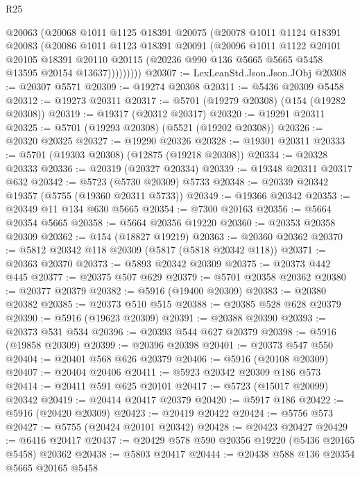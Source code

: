 \begin{lexlean}{R25}
\begin{coremodule}
            @20063
            (@20068
              @1011
              @1125
              @18391
              @20075
              (@20078
                @1011
                @1124
                @18391
                @20083
                (@20086
                  @1011
                  @1123
                  @18391
                  @20091
                  (@20096
                    @1011
                    @1122
                    @20101
                    @20105
                    @18391
                    @20110
                    @20115
                    (@20236 @990 @136 @5665 @5665 @5458 @13595 @20154 @13637)))))))))
@20307 := LexLeanStd.Json.Json.JObj
@20308 := @20307 @5571
@20309 := @19274 @20308
@20311 := @5436 @20309 @5458
@20312 := @19273 @20311
@20317 := @5701 (@19279 @20308) (@154 (@19282 @20308))
@20319 := @19317 (@20312 @20317)
@20320 := @19291 @20311
@20325 := @5701 (@19293 @20308) (@5521 (@19202 @20308))
@20326 := @20320 @20325
@20327 := @19290 @20326
@20328 := @19301 @20311
@20333 := @5701 (@19303 @20308) (@12875 (@19218 @20308))
@20334 := @20328 @20333
@20336 := @20319 (@20327 @20334)
@20339 := @19348 @20311 @20317 @632
@20342 := @5723 (@5730 @20309) @5733
@20348 := @20339 @20342 @19357 (@5755 (@19360 @20311 @5733))
@20349 := @19366 @20342
@20353 := @20349 @11 @134 @630 @5665
@20354 := @7300 @20163
@20356 := @5664 @20354 @5665
@20358 := @5664 @20356 @19220
@20360 := @20353 @20358 @20309
@20362 := @154 (@18827 @19219)
@20363 := @20360 @20362
@20370 := @5812 @20342 @118 @20309 (@5817 (@5818 @20342 @118))
@20371 := @20363 @20370
@20373 := @5893 @20342 @20309
@20375 := @20373 @442 @445
@20377 := @20375 @507 @629
@20379 := @5701 @20358 @20362
@20380 := @20377 @20379
@20382 := @5916 (@19400 @20309)
@20383 := @20380 @20382
@20385 := @20373 @510 @515
@20388 := @20385 @528 @628 @20379
@20390 := @5916 (@19623 @20309)
@20391 := @20388 @20390
@20393 := @20373 @531 @534
@20396 := @20393 @544 @627 @20379
@20398 := @5916 (@19858 @20309)
@20399 := @20396 @20398
@20401 := @20373 @547 @550
@20404 := @20401 @568 @626 @20379
@20406 := @5916 (@20108 @20309)
@20407 := @20404 @20406
@20411 := @5923 @20342 @20309 @186 @573
@20414 := @20411 @591 @625 @20101
@20417 := @5723 (@15017 @20099) @20342
@20419 := @20414 @20417 @20379
@20420 := @5917 @186
@20422 := @5916 (@20420 @20309)
@20423 := @20419 @20422
@20424 := @5756 @573
@20427 := @5755 (@20424 @20101 @20342)
@20428 := @20423 @20427
@20429 := @6416 @20417
@20437 := @20429 @578 @590 @20356 @19220 (@5436 @20165 @5458) @20362
@20438 := @5803 @20417
@20444 := @20438 @588 @136 @20354 @5665 @20165 @5458

\end{coremodule}
\end{lexlean}
